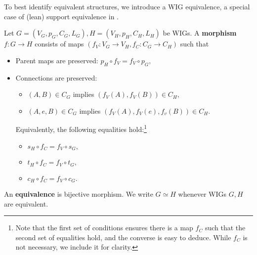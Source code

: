 \begin{itemize}
To best identify equivalent structures, we introduce a WIG equivalence, a special case of (lean) support equivalence in \cite{jensen-milner-bigraph}.
\begin{definition}
  Let $G = (V_{G}, p_{G}, C_{G}, L_{G}), H = (V_{H}, p_{H}, C_{H}, L_{H})$ be WIGs. A \textbf{morphism} $f: G \to H$ consists of maps ${(f_{V}: V_{G} \to V_{H}, f_{C}: C_{G} \to C_{H})}$ such that
  \begin{itemize}
    \item Parent maps are preserved: $p_{H} \circ f_{V} = f_{V} \circ p_{G},$
    \item Connections are preserved:
    \begin{itemize}
      \item $(A, B) \in C_{G}$ implies $(f_{V}(A), f_{V}(B)) \in C_{H},$
      \item $(A, e, B) \in C_{G}$ implies $(f_{V}(A), f_{V}(e), f_{v}(B)) \in C_{H}.$
    \end{itemize}
    Equivalently, the following equalities hold:\footnote{Note that the first set of conditions ensures there is a map $f_{C}$ such that the second set of equalities hold, and the converse is easy to deduce. While  $f_{C}$ is not necessary, we include it for clarity.}
    \begin{itemize}
      \item $s_{H} \circ f_{C} = f_{V} \circ s_{G},$
      \item $t_{H} \circ f_{C} = f_{V} \circ t_{G},$
      \item $c_{H} \circ f_{C} = f_{V} \circ c_{G}.$
    \end{itemize}
  \end{itemize}
  An \textbf{equivalence} is bijective morphism. We write $G \simeq H$ whenever WIGs $G, H$ are equivalent.
\end{definition}



\end{itemize}
